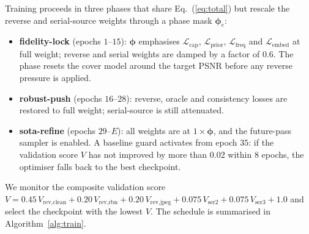 \documentclass[conference]{IEEEtran}
\begin{document}
Training proceeds in three phases that share Eq.~(\ref{eq:total}) but rescale the reverse and serial-source weights through a phase mask $\boldsymbol{\phi}_{e}$:
\begin{itemize}
    \item \textbf{fidelity-lock} (epochs $1$--$15$): $\boldsymbol{\phi}$ emphasises $\mathcal{L}_{\text{cap}}$, $\mathcal{L}_{\text{prior}}$, $\mathcal{L}_{\text{freq}}$ and $\mathcal{L}_{\text{embed}}$ at full weight; reverse and serial weights are damped by a factor of $0.6$. The phase resets the cover model around the target PSNR before any reverse pressure is applied.
    \item \textbf{robust-push} (epochs $16$--$28$): reverse, oracle and consistency losses are restored to full weight; serial-source is still attenuated.
    \item \textbf{sota-refine} (epochs $29$--$E$): all weights are at $1\!\times\!\boldsymbol{\phi}$, and the future-pass sampler is enabled. A baseline guard activates from epoch $35$: if the validation score $V$ has not improved by more than $0.02$ within $8$ epochs, the optimiser falls back to the best checkpoint.
\end{itemize}
We monitor the composite validation score $V = 0.45\,V_{\text{rev,clean}} + 0.20\,V_{\text{rev,rbn}} + 0.20\,V_{\text{rev,jpeg}} + 0.075\,V_{\text{ser2}} + 0.075\,V_{\text{ser3}} + 1.0$ and select the checkpoint with the lowest $V$. The schedule is summarised in Algorithm~\ref{alg:train}.
\end{document}
